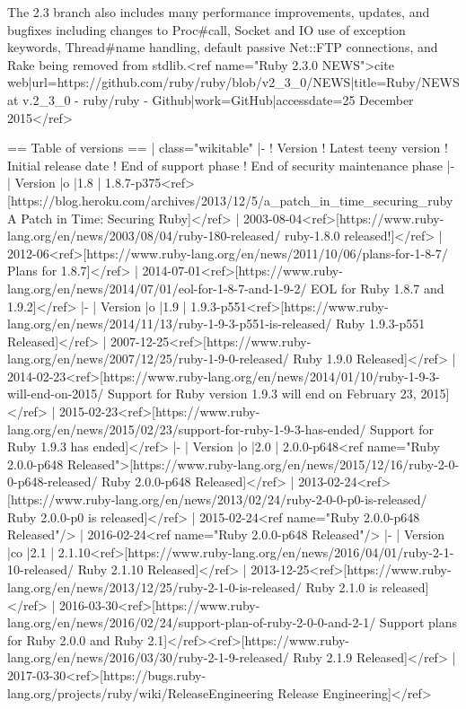 The 2.3 branch also includes many performance improvements, updates, and bugfixes including changes to Proc#call, Socket and IO use of exception keywords, Thread#name handling, default passive Net::FTP connections, and Rake being removed from stdlib.<ref name="Ruby 2.3.0 NEWS">{{cite web|url=https://github.com/ruby/ruby/blob/v2_3_0/NEWS|title=Ruby/NEWS at v.2_3_0 - ruby/ruby - Github|work=GitHub|accessdate=25 December 2015}}</ref>

== Table of versions ==
{| class="wikitable"
|-
! Version
! Latest teeny version
! Initial release date
! End of support phase
! End of security maintenance phase
|-
| {{Version |o |1.8}}
| 1.8.7-p375<ref>[https://blog.heroku.com/archives/2013/12/5/a_patch_in_time_securing_ruby A Patch in Time: Securing Ruby]</ref>
| 2003-08-04<ref>[https://www.ruby-lang.org/en/news/2003/08/04/ruby-180-released/ ruby-1.8.0 released!]</ref>
| 2012-06<ref>[https://www.ruby-lang.org/en/news/2011/10/06/plans-for-1-8-7/ Plans for 1.8.7]</ref>
| 2014-07-01<ref>[https://www.ruby-lang.org/en/news/2014/07/01/eol-for-1-8-7-and-1-9-2/ EOL for Ruby 1.8.7 and 1.9.2]</ref>
|-
| {{Version |o |1.9}}
| 1.9.3-p551<ref>[https://www.ruby-lang.org/en/news/2014/11/13/ruby-1-9-3-p551-is-released/ Ruby 1.9.3-p551 Released]</ref>
| 2007-12-25<ref>[https://www.ruby-lang.org/en/news/2007/12/25/ruby-1-9-0-released/ Ruby 1.9.0 Released]</ref>
| 2014-02-23<ref>[https://www.ruby-lang.org/en/news/2014/01/10/ruby-1-9-3-will-end-on-2015/ Support for Ruby version 1.9.3 will end on February 23, 2015]</ref>
| 2015-02-23<ref>[https://www.ruby-lang.org/en/news/2015/02/23/support-for-ruby-1-9-3-has-ended/ Support for Ruby 1.9.3 has ended]</ref>
|-
| {{Version |o |2.0}}
| 2.0.0-p648<ref name="Ruby 2.0.0-p648 Released">[https://www.ruby-lang.org/en/news/2015/12/16/ruby-2-0-0-p648-released/ Ruby 2.0.0-p648 Released]</ref>
| 2013-02-24<ref>[https://www.ruby-lang.org/en/news/2013/02/24/ruby-2-0-0-p0-is-released/ Ruby 2.0.0-p0 is released]</ref>
| 2015-02-24<ref name="Ruby 2.0.0-p648 Released"/>
| 2016-02-24<ref name="Ruby 2.0.0-p648 Released"/>
|-
| {{Version |co |2.1}}
| 2.1.10<ref>[https://www.ruby-lang.org/en/news/2016/04/01/ruby-2-1-10-released/ Ruby 2.1.10 Released]</ref>
| 2013-12-25<ref>[https://www.ruby-lang.org/en/news/2013/12/25/ruby-2-1-0-is-released/ Ruby 2.1.0 is released]</ref>
| 2016-03-30<ref>[https://www.ruby-lang.org/en/news/2016/02/24/support-plan-of-ruby-2-0-0-and-2-1/ Support plans for Ruby 2.0.0 and Ruby 2.1]</ref><ref>[https://www.ruby-lang.org/en/news/2016/03/30/ruby-2-1-9-released/ Ruby 2.1.9 Released]</ref>
| 2017-03-30<ref>[https://bugs.ruby-lang.org/projects/ruby/wiki/ReleaseEngineering Release Engineering]</ref>
}
